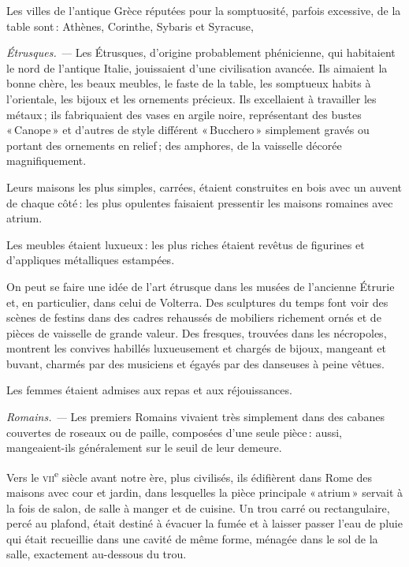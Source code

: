 Les villes de l'antique Grèce réputées pour la somptuosité, parfois excessive,
de la table sont : Athènes, Corinthe, Sybaris et Syracuse,

\sk

\textit{Étrusques. —} Les Étrusques, d'origine probablement phénicienne, qui
habitaient le nord de l'antique Italie, jouissaient d'une civilisation
avancée. Ils aimaient la bonne chère, les beaux meubles, le faste de la table,
les somptueux habits à l'orientale, les bijoux et les ornements précieux. Ils
excellaient à travailler les métaux ; ils fabriquaient des vases en argile
noire, représentant des bustes « Canope » et d'autres de style différent
« Bucchero » simplement gravés ou portant des ornements en relief ; des
amphores, de la vaisselle décorée magnifiquement.

Leurs maisons les plus simples, carrées, étaient construites en bois avec un
auvent de chaque côté : les plus opulentes faisaient pressentir les maisons
romaines avec atrium.

Les meubles étaient luxueux : les plus riches étaient revêtus de figurines et
d'appliques métalliques estampées.

On peut se faire une idée de l'art étrusque dans les musées de l'ancienne
Étrurie et, en particulier, dans celui de Volterra. Des sculptures du temps
font voir des scènes de festins dans des cadres rehaussés de mobiliers
richement ornés et de pièces de vaisselle de grande valeur. Des fresques,
trouvées dans les nécropoles, montrent les convives habillés luxueusement et
chargés de bijoux, mangeant et buvant, charmés par des musiciens et égayés par
des danseuses à peine vêtues.

Les femmes étaient admises aux repas et aux réjouissances.

\sk

\textit{Romains. —} Les premiers Romains vivaient très simplement dans des
cabanes couvertes de roseaux ou de paille, composées d'une seule pièce : aussi,
mangeaient-ils généralement sur le seuil de leur demeure.

Vers le \textsc{vii}\textsuperscript{e} siècle avant notre ère, plus civilisés,
ils édifièrent dans Rome des maisons avec cour et jardin, dans lesquelles la
pièce principale « atrium » servait à la fois de salon, de salle à manger et de
cuisine. Un trou carré ou rectangulaire, percé au plafond, était destiné
à évacuer la fumée et à laisser passer l'eau de pluie qui était recueillie dans
une cavité de même forme, ménagée dans le sol de la salle, exactement
au-dessous du trou.

